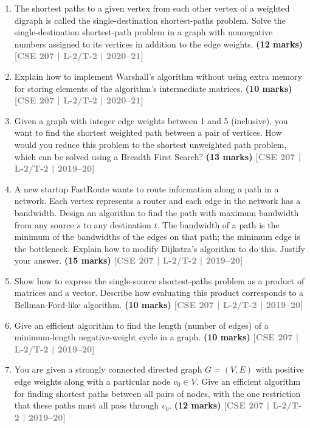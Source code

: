 \documentclass[12pt,a3paper]{article}
\newcommand{\yr}[1]{\hfill\textcolor{gray}{\small\textbf{[#1]}}}
\newcommand{\mk}[1]{\textcolor{orange!70!black}{\small\textbf{(#1 marks)}}}
\begin{document}
\begin{enumerate}
\begin{center}
\begin{tikzpicture}
    \end{tikzpicture}
\end{center}

\mk{12} \yr{CSE 207 | L-2/T-2 | 2020--21}

\item The shortest paths to a given vertex from each other vertex of a weighted digraph is called the single-destination shortest-paths problem. Solve the single-destination shortest-path problem in a graph with nonnegative numbers assigned to its vertices in addition to the edge weights.
\mk{12} \yr{CSE 207 | L-2/T-2 | 2020--21}

\item Explain how to implement Warshall's algorithm without using extra memory for storing elements of the algorithm's intermediate matrices.
\mk{10} \yr{CSE 207 | L-2/T-2 | 2020--21}

\item Given a graph with integer edge weights between 1 and 5 (inclusive), you want to find the shortest weighted path between a pair of vertices. How would you reduce this problem to the shortest unweighted path problem, which can be solved using a Breadth First Search?
\mk{13} \yr{CSE 207 | L-2/T-2 | 2019--20}

\item A new startup FastRoute wants to route information along a path in a network. Each vertex represents a router and each edge in the network has a bandwidth. Design an algorithm to find the path with maximum bandwidth from any source $s$ to any destination $t$. The bandwidth of a path is the minimum of the bandwidths of the edges on that path; the minimum edge is the bottleneck. Explain how to modify Dijkstra's algorithm to do this. Justify your answer.
\mk{15} \yr{CSE 207 | L-2/T-2 | 2019--20}

\item Show how to express the single-source shortest-paths problem as a product of matrices and a vector. Describe how evaluating this product corresponds to a Bellman-Ford-like algorithm.
\mk{10} \yr{CSE 207 | L-2/T-2 | 2019--20}

\item Give an efficient algorithm to find the length (number of edges) of a minimum-length negative-weight cycle in a graph.
\mk{10} \yr{CSE 207 | L-2/T-2 | 2019--20}

\item You are given a strongly connected directed graph $G = (V, E)$ with positive edge weights along with a particular node $v_0 \in V$. Give an efficient algorithm for finding shortest paths between all pairs of nodes, with the one restriction that these paths must all pass through $v_0$.
\mk{12} \yr{CSE 207 | L-2/T-2 | 2019--20}


\end{enumerate}
\end{document}
